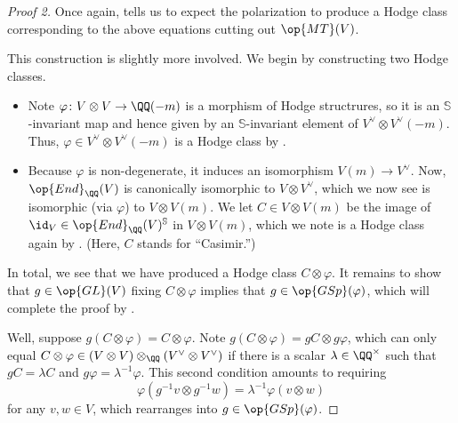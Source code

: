 \documentclass[../thesis.tex]{subfiles}
\begin{document}
\begin{proof}[Proof 2]
	Once again,  tells us to expect the polarization to produce a Hodge class corresponding to the above equations cutting out $\op{MT}(V)$.
	
	This construction is slightly more involved. We begin by constructing two Hodge classes.
	\begin{itemize}
		\item Note $\varphi\colon V\otimes V\to\QQ(-m)$ is a morphism of Hodge structrures, so it is an $\mathbb S$-invariant map and hence given by an $\mathbb S$-invariant element of $V^\lor\otimes V^\lor(-m)$. Thus, $\varphi\in V^\lor\otimes V^\lor(-m)$ is a Hodge class by .
		\item Because $\varphi$ is non-degenerate, it induces an isomorphism $V(m)\to V^\lor$. Now, $\op{End}_\QQ(V)$ is canonically isomorphic to $V\otimes V^\lor$, which we now see is isomorphic (via $\varphi$) to $V\otimes V(m)$. We let $C\in V\otimes V(m)$ be the image of ${\id_V}\in\op{End}_\QQ(V)^{\mathbb S}$ in $V\otimes V(m)$, which we note is a Hodge class again by . (Here, $C$ stands for ``Casimir.'')
	\end{itemize}
	In total, we see that we have produced a Hodge class $C\otimes\varphi$. It remains to show that $g\in\op{GL}(V)$ fixing $C\otimes\varphi$ implies that $g\in\op{GSp}(\varphi)$, which will complete the proof by .

	Well, suppose $g(C\otimes\varphi)=C\otimes\varphi$. Note $g(C\otimes\varphi)=gC\otimes g\varphi$, which can only equal $C\otimes\varphi\in(V\otimes V)\otimes_\QQ(V^\lor\otimes V^\lor)$ if there is a scalar $\lambda\in\QQ^\times$ such that $gC=\lambda C$ and $g\varphi=\lambda^{-1}\varphi$. This second condition amounts to requiring
	\[\varphi\left(g^{-1}v\otimes g^{-1}w\right)=\lambda^{-1}\varphi(v\otimes w)\]
	for any $v,w\in V$, which rearranges into $g\in\op{GSp}(\varphi)$.
\end{proof}
\end{document}
